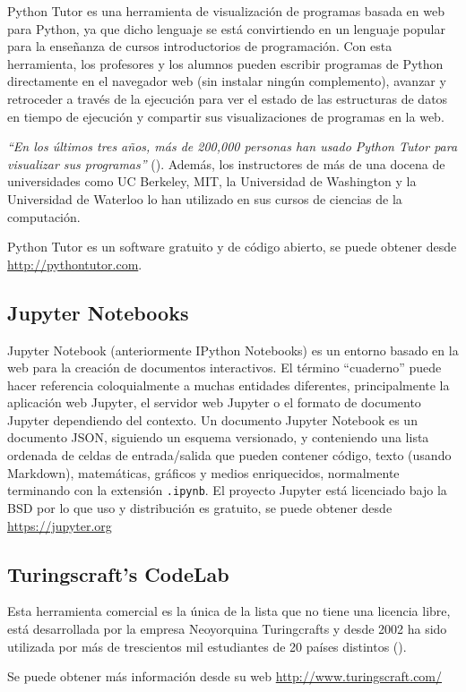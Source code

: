 Python Tutor es una herramienta de visualización de programas basada en web para Python, ya que dicho lenguaje se está convirtiendo en un lenguaje popular para la enseñanza de cursos introductorios de programación. Con esta herramienta, los profesores y los alumnos pueden escribir programas de Python directamente en el navegador web (sin instalar ningún complemento), avanzar y retroceder a través de la ejecución para ver el estado de las estructuras de datos en tiempo de ejecución y compartir sus visualizaciones de programas en la web.

\bigskip
\textit{``En los últimos tres años, más de 200,000 personas han usado Python Tutor para visualizar sus programas''} (\cite{GuoSIGCSE2013}). Además, los instructores de más de una docena de universidades como UC Berkeley, MIT, la Universidad de Washington y la Universidad de Waterloo lo han utilizado en sus cursos de ciencias de la computación.

\bigskip
Python Tutor es un software gratuito y de código abierto, se puede obtener desde \url{http://pythontutor.com}.


\subsection {Jupyter Notebooks}

Jupyter Notebook (anteriormente IPython Notebooks) es un entorno basado en la web para la creación de documentos interactivos. El término ``cuaderno'' puede hacer referencia coloquialmente a muchas entidades diferentes, principalmente la aplicación web Jupyter, el servidor web Jupyter o el formato de documento Jupyter dependiendo del contexto. Un documento Jupyter Notebook es un documento JSON, siguiendo un esquema versionado, y conteniendo una lista ordenada de celdas de entrada/salida que pueden contener código, texto (usando Markdown), matemáticas, gráficos y medios enriquecidos, normalmente terminando con la extensión \texttt{.ipynb}. El proyecto Jupyter está licenciado bajo la BSD por lo que uso y distribución es gratuito, se puede obtener desde \url{https://jupyter.org}

\subsection {Turingscraft's CodeLab}

Esta herramienta comercial es la única de la lista que no tiene una licencia libre, está desarrollada por la empresa Neoyorquina Turingcrafts y desde 2002 ha sido utilizada por más de trescientos mil estudiantes de 20 países distintos (\cite{barr_using_2016}).

\bigskip
Se puede obtener más información desde su web \url{http://www.turingscraft.com/}


